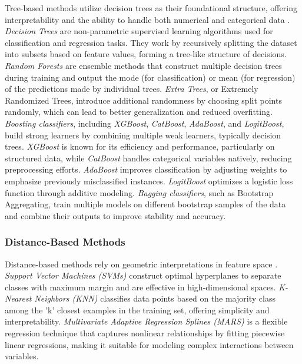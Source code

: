 \documentclass[preprint,12pt]{elsarticle}
\begin{document}
Tree-based methods utilize decision trees as their foundational structure, offering interpretability and the ability to handle both numerical and categorical data \cite{james2023tree}. \textit{Decision Trees} are non-parametric supervised learning algorithms used for classification and regression tasks. They work by recursively splitting the dataset into subsets based on feature values, forming a tree-like structure of decisions. \textit{Random Forests} are ensemble methods that construct multiple decision trees during training and output the mode (for classification) or mean (for regression) of the predictions made by individual trees. \textit{Extra Trees}, or Extremely Randomized Trees, introduce additional randomness by choosing split points randomly, which can lead to better generalization and reduced overfitting. \textit{Boosting classifiers}, including \textit{XGBoost}, \textit{CatBoost}, \textit{AdaBoost}, and \textit{LogitBoost}, build strong learners by combining multiple weak learners, typically decision trees. \textit{XGBoost} is known for its efficiency and performance, particularly on structured data, while \textit{CatBoost} handles categorical variables natively, reducing preprocessing efforts. \textit{AdaBoost} improves classification by adjusting weights to emphasize previously misclassified instances. \textit{LogitBoost} optimizes a logistic loss function through additive modeling. \textit{Bagging classifiers}, such as Bootstrap Aggregating, train multiple models on different bootstrap samples of the data and combine their outputs to improve stability and accuracy.

\subsubsection{Distance-Based Methods}

Distance-based methods rely on geometric interpretations in feature space \cite{hsu2002comparison}. \textit{Support Vector Machines (SVMs)} construct optimal hyperplanes to separate classes with maximum margin and are effective in high-dimensional spaces. \textit{K-Nearest Neighbors (KNN)} classifies data points based on the majority class among the 'k' closest examples in the training set, offering simplicity and interpretability. \textit{Multivariate Adaptive Regression Splines (MARS)} \cite{friedman1995introduction} is a flexible regression technique that captures nonlinear relationships by fitting piecewise linear regressions, making it suitable for modeling complex interactions between variables.
\end{document}
